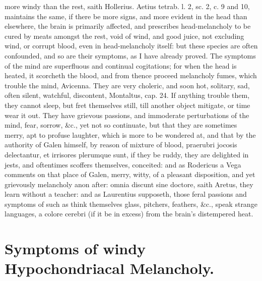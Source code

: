 {more windy than the rest, saith Hollerius. Aetius tetrab. l. 2,
sc. 2, c. 9 and 10, maintains the same, if there be more signs,
and more evident in the head than elsewhere, the brain is primarily
affected, and prescribes head-melancholy to be cured by meats amongst
the rest, void of wind, and good juice, not excluding wind, or corrupt
blood, even in head-melancholy itself: but these species are often
confounded, and so are their symptoms, as I have already proved. The
symptoms of the mind are superfluous and continual cogitations;
for when the head is heated, it scorcheth the blood, and from
thence proceed melancholy fumes, which trouble the mind, Avicenna. They
are very choleric, and soon hot, solitary, sad, often silent, watchful,
discontent, Montaltus, cap. 24. If anything trouble them, they cannot
sleep, but fret themselves still, till another object mitigate, or time
wear it out. They have grievous passions, and immoderate perturbations
of the mind, fear, sorrow, \&c., yet not so continuate, but that they
are sometimes merry, apt to profuse laughter, which is more to be
wondered at, and that by the authority of Galen himself, by
reason of mixture of blood, praerubri jocosis delectantur, et irrisores
plerumque sunt, if they be ruddy, they are delighted in jests, and
oftentimes scoffers themselves, conceited: and as Rodericus a Vega
comments on that place of Galen, merry, witty, of a pleasant
disposition, and yet grievously melancholy anon after: omnia discunt
sine doctore, saith Aretus, they learn without a teacher: and as
Laurentius supposeth, those feral passions and symptoms of such
as think themselves glass, pitchers, feathers, \&c., speak strange
languages, a colore cerebri (if it be in excess) from the brain's
distempered heat.

\section{Symptoms of windy Hypochondriacal Melancholy.}

}
